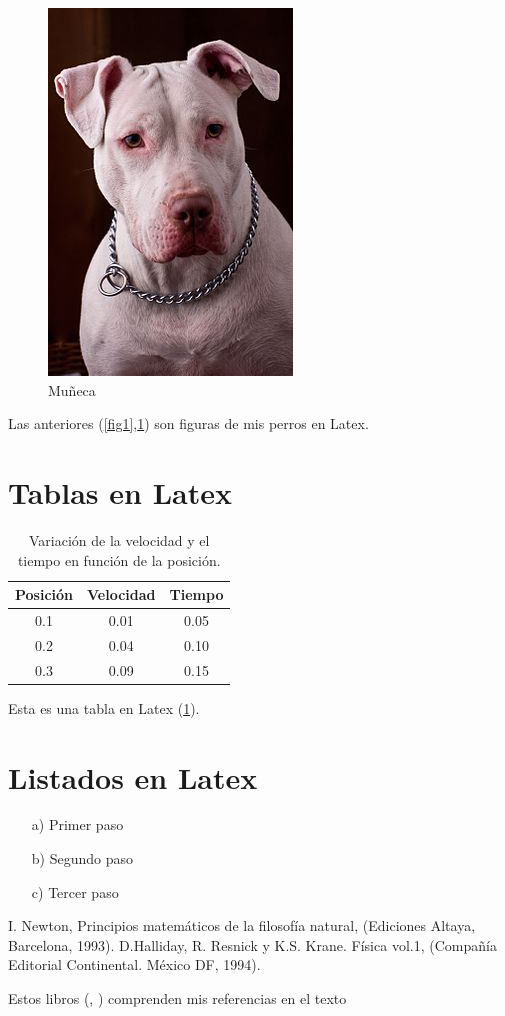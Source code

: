 \documentclass{article}
\begin{document}
    \begin{figure}[H]
        \centering
       \includegraphics[scale=0.3]{fig2.png}
    \caption{Muñeca\label{fig2}}
\end{figure}

Las anteriores (\ref{fig1},\ref{fig2}) son figuras de mis perros en Latex.

\section*{Tablas en Latex}
\begin{table}[H]
    \centering
    \begin{tabular}{c|c|c}
    \hline\hline
       Posición  &  Velocidad & Tiempo\\ \hline\hline
        0.1 & 0.01 & 0.05\\
        0.2 & 0.04 & 0.10\\
        0.3 & 0.09 & 0.15\\
        \hline
    \end{tabular}
    \caption{Variación de la velocidad y el tiempo en función de la posición.}
    \label{t1}
\end{table}

Esta es una tabla en Latex (\ref{t1}).

\section*{Listados en Latex}

\begin{itemize}
    \item[a)] Primer paso
    \item[b)] Segundo paso
    \item[c)] Tercer paso
\end{itemize}

\begin{thebibliography}{2}
 I. Newton, Principios matemáticos de la filosofía natural, (Ediciones Altaya,     Barcelona, 1993).
 D.Halliday, R. Resnick y K.S. Krane. Física vol.1, (Compañía Editorial Continental. México DF, 1994).
\end{thebibliography}

Estos libros (\cite{1}, \cite{2}) comprenden mis referencias en el texto
\end{document}
